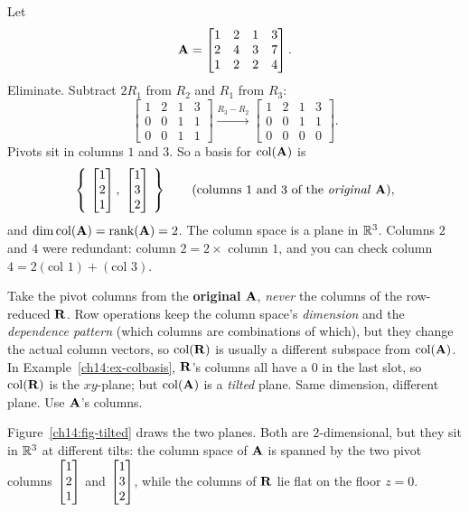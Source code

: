 \begin{example}
\label{ch14:ex-colbasis}
Let
\[
  \mathbf{A}=\begin{bmatrix} 1 & 2 & 1 & 3\\ 2 & 4 & 3 & 7\\ 1 & 2 & 2 & 4\end{bmatrix}.
\]
Eliminate. Subtract $2R_1$ from $R_2$ and $R_1$ from $R_3$:
\[
  \begin{bmatrix} 1 & 2 & 1 & 3\\ 0 & 0 & 1 & 1\\ 0 & 0 & 1 & 1\end{bmatrix}
  \xrightarrow{R_3-R_2}
  \begin{bmatrix} 1 & 2 & 1 & 3\\ 0 & 0 & 1 & 1\\ 0 & 0 & 0 & 0\end{bmatrix}.
\]
Pivots sit in columns $1$ and $3$. So a basis for $\operatorname{col}(\mathbf{A})$ is
\[
  \left\{\ \colvec{1\\2\\1},\ \colvec{1\\3\\2}\ \right\}
  \qquad(\text{columns } 1 \text{ and } 3 \text{ of the \emph{original} } \mat{A}),
\]
and $\operatorname{dim}\operatorname{col}(\mathbf{A}) = \operatorname{rank}(\mathbf{A}) = 2$. The column space is a plane in
$\mathbb{R}^3$. Columns $2$ and $4$ were redundant: column $2 = 2\times$ column $1$,
and you can check column $4 = 2(\text{col }1) + (\text{col }3)$.
\end{example}

\begin{trapbox}
Take the pivot columns from the \textbf{original} $\mathbf{A}$, \emph{never} the
columns of the row-reduced $\mathbf{R}$. Row operations keep the column space's
\emph{dimension} and the \emph{dependence pattern} (which columns are combinations of which), but they change the actual
column vectors, so $\operatorname{col}(\mathbf{R})$ is usually a different subspace from
$\operatorname{col}(\mathbf{A})$. In Example~\ref{ch14:ex-colbasis}, $\mathbf{R}$'s columns all have a
$0$ in the last slot, so $\operatorname{col}(\mathbf{R})$ is the $xy$-plane; but $\operatorname{col}(\mathbf{A})$ is
a \emph{tilted} plane. Same dimension, different plane. Use $\mathbf{A}$'s columns.
\end{trapbox}

Figure~\ref{ch14:fig-tilted} draws the two planes. Both are $2$-dimensional, but they sit in $\mathbb{R}^3$ at different tilts: the
column space of $\mathbf{A}$ is spanned by the two pivot columns
$\begin{bmatrix}1\\2\\1\end{bmatrix}$ and $\begin{bmatrix}1\\3\\2\end{bmatrix}$, while the columns of $\mathbf{R}$ lie flat
on the floor $z=0$.

